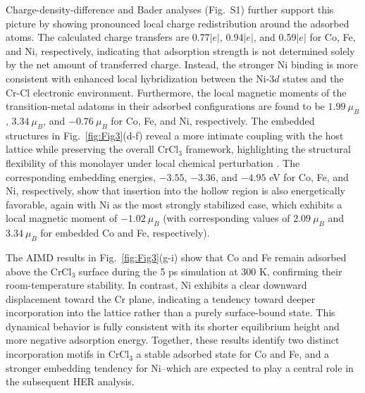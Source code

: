 \documentclass[a4paper,fleqn]{cas-dc}
\begin{document}
Charge-density-difference and Bader analyses (Fig.~S1) further support this picture by showing pronounced local charge redistribution around the adsorbed atoms. The calculated charge transfers are 0.77$|e|$, 0.94$|e|$, and 0.59$|e|$ for Co, Fe, and Ni, respectively, indicating that adsorption strength is not determined solely by the net amount of transferred charge.
Instead, the stronger Ni binding is more consistent with enhanced local hybridization between the Ni-$3d$ states and the Cr-Cl electronic environment. Furthermore, the local magnetic moments of the transition-metal adatoms in their adsorbed configurations are found to be $1.99 \ \mu_B$, $3.34 \ \mu_B$, and $-0.76 \ \mu_B$ for Co, Fe, and Ni, respectively. The embedded structures in Fig.~\ref{fig:Fig3}(d-f) reveal a more intimate coupling with the host lattice while preserving the overall CrCl$_3$ framework, highlighting the structural flexibility of this monolayer under local chemical perturbation \cite{Wang2019,Gao2018,Mastrippolito2021,Mastrippolito2022}.
The corresponding embedding energies, $-3.55$, $-3.36$, and $-4.95$ eV for Co, Fe, and Ni, respectively, show that insertion into the hollow region is also energetically favorable, again with Ni as the most strongly stabilized case, which exhibits a local magnetic moment of $-1.02 \ \mu_B$ (with corresponding values of $2.09 \ \mu_B$ and $3.34 \ \mu_B$ for embedded Co and Fe, respectively).

The AIMD results in Fig.~\ref{fig:Fig3}(g-i) show that Co and Fe remain adsorbed above the CrCl$_3$ surface during the 5 ps simulation at 300 K, confirming their room-temperature stability. In contrast, Ni exhibits a clear downward displacement toward the Cr plane, indicating a tendency toward deeper incorporation into the lattice rather than a purely surface-bound state. This dynamical behavior is fully consistent with its shorter equilibrium height and more negative adsorption energy. Together, these results identify two distinct incorporation motifs in CrCl$_3$ a stable adsorbed state for Co and Fe, and a stronger embedding tendency for Ni--which are expected to play a central role in the subsequent HER analysis.
\end{document}
